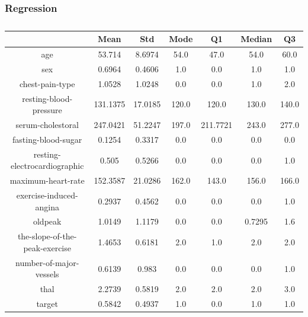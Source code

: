 \documentclass{classrep}
\begin{document}
{{{            }

            \subsubsection{Regression}
            \label{results:15-percent:regression} {
                \begin{table}[!htbp]
                    \centering
                    \begin{tabular}{|c|c|c|c|c|c|c|}
                        \hline
                        & Mean & Std & Mode & Q1 & Median & Q3 \\ \hline
                        age & 53.714 & 8.6974 & 54.0 & 47.0 & 54.0 & 60.0 \\ \hline
                        sex & 0.6964 & 0.4606 & 1.0 & 0.0 & 1.0 & 1.0 \\ \hline
                        chest-pain-type & 1.0528 & 1.0248 & 0.0 & 0.0 & 1.0 & 2.0 \\ \hline
                        resting-blood-pressure & 131.1375 & 17.0185 & 120.0 & 120.0 & 130.0 & 140.0 \\ \hline
                        serum-cholestoral & 247.0421 & 51.2247 & 197.0 & 211.7721 & 243.0 & 277.0 \\ \hline
                        fasting-blood-sugar & 0.1254 & 0.3317 & 0.0 & 0.0 & 0.0 & 0.0 \\ \hline
                        resting-electrocardiographic & 0.505 & 0.5266 & 0.0 & 0.0 & 0.0 & 1.0 \\ \hline
                        maximum-heart-rate & 152.3587 & 21.0286 & 162.0 & 143.0 & 156.0 & 166.0 \\ \hline
                        exercise-induced-angina & 0.2937 & 0.4562 & 0.0 & 0.0 & 0.0 & 1.0 \\ \hline
                        oldpeak & 1.0149 & 1.1179 & 0.0 & 0.0 & 0.7295 & 1.6 \\ \hline
                        the-slope-of-the-peak-exercise & 1.4653 & 0.6181 & 2.0 & 1.0 & 2.0 & 2.0 \\ \hline
                        number-of-major-vessels & 0.6139 & 0.983 & 0.0 & 0.0 & 0.0 & 1.0 \\ \hline
                        thal & 2.2739 & 0.5819 & 2.0 & 2.0 & 2.0 & 3.0 \\ \hline
                        target & 0.5842 & 0.4937 & 1.0 & 0.0 & 1.0 & 1.0 \\ \hline
                    \end{tabular}
                    \caption{}
                    \label{result_15_Regression}
                \end{table}
                \FloatBarrier

}}}
\end{document}
